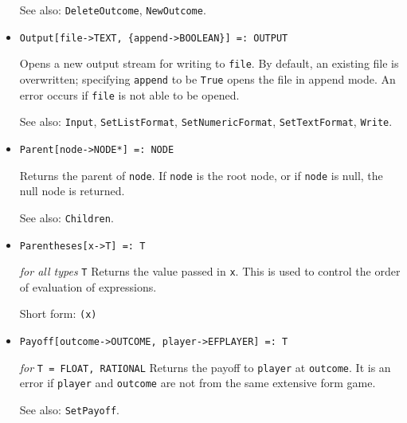 \begin{itemize}
{\it for} {\tt T = FLOAT, RATIONAL}
\bd
Returns the list of outcomes defined on \verb+efg+.
\item [See also:] \verb+DeleteOutcome+, \verb+NewOutcome+.
\ed

\item{}
\protect \large \begin{verbatim}
Output[file->TEXT, {append->BOOLEAN}] =: OUTPUT
\end{verbatim}\normalsize

\bd
Opens a new output stream for writing to \verb+file+.  By default,
an existing file is overwritten; specifying \verb+append+ to be \verb+True+
opens the file in append mode.  An error occurs if \verb+file+ is not
able to be opened.
\item [See also:] \verb+Input+, \verb+SetListFormat+, \verb+SetNumericFormat+,
\verb+SetTextFormat+, \verb+Write+.
\ed


\item{}
\protect \large \begin{verbatim}
Parent[node->NODE*] =: NODE
\end{verbatim}\normalsize

\bd
Returns the parent of \verb+node+.  If \verb+node+ is the root node,
or if \verb+node+ is null, the null node is returned.
\item [See also:] \verb+Children+.
\ed

\item{}
\protect \large \begin{verbatim}
Parentheses[x->T] =: T
\end{verbatim}\normalsize

{\it for all types} {\tt T}
\bd
Returns the value passed in \verb+x+.  This is used to control
the order of evaluation of expressions.
\item [Short form:] \verb+(x)+
\ed

\item{}
\protect \large \begin{verbatim}
Payoff[outcome->OUTCOME, player->EFPLAYER] =: T
\end{verbatim}\normalsize

{\it for} {\tt T = FLOAT, RATIONAL}
\bd
Returns the payoff to \verb+player+ at \verb+outcome+.  It is an error if
\verb+player+ and \verb+outcome+ are not from the same extensive form game.
\item [See also:] \verb+SetPayoff+.
\ed


\end{itemize}
